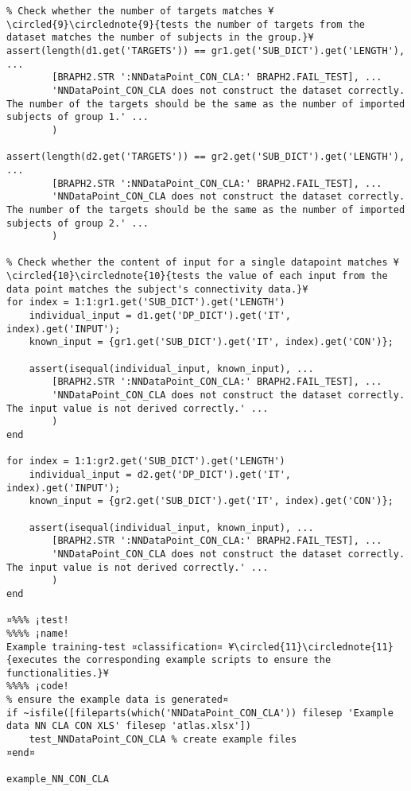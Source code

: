 \documentclass{tufte-handout}
\begin{document}
\begin{lstlisting}
% Check whether the number of targets matches ¥\circled{9}\circlednote{9}{tests the number of targets from the dataset matches the number of subjects in the group.}¥
assert(length(d1.get('TARGETS')) == gr1.get('SUB_DICT').get('LENGTH'), ...
		[BRAPH2.STR ':NNDataPoint_CON_CLA:' BRAPH2.FAIL_TEST], ...
		'NNDataPoint_CON_CLA does not construct the dataset correctly. The number of the targets should be the same as the number of imported subjects of group 1.' ...
		)

assert(length(d2.get('TARGETS')) == gr2.get('SUB_DICT').get('LENGTH'), ...
		[BRAPH2.STR ':NNDataPoint_CON_CLA:' BRAPH2.FAIL_TEST], ...
		'NNDataPoint_CON_CLA does not construct the dataset correctly. The number of the targets should be the same as the number of imported subjects of group 2.' ...
		)

% Check whether the content of input for a single datapoint matches ¥\circled{10}\circlednote{10}{tests the value of each input from the data point matches the subject's connectivity data.}¥
for index = 1:1:gr1.get('SUB_DICT').get('LENGTH')
    individual_input = d1.get('DP_DICT').get('IT', index).get('INPUT');
    known_input = {gr1.get('SUB_DICT').get('IT', index).get('CON')};

    assert(isequal(individual_input, known_input), ...
        [BRAPH2.STR ':NNDataPoint_CON_CLA:' BRAPH2.FAIL_TEST], ...
        'NNDataPoint_CON_CLA does not construct the dataset correctly. The input value is not derived correctly.' ...
        )
end

for index = 1:1:gr2.get('SUB_DICT').get('LENGTH')
    individual_input = d2.get('DP_DICT').get('IT', index).get('INPUT');
    known_input = {gr2.get('SUB_DICT').get('IT', index).get('CON')};

    assert(isequal(individual_input, known_input), ...
        [BRAPH2.STR ':NNDataPoint_CON_CLA:' BRAPH2.FAIL_TEST], ...
        'NNDataPoint_CON_CLA does not construct the dataset correctly. The input value is not derived correctly.' ...
        )
end

¤%%% ¡test! 
%%%% ¡name!
Example training-test ¤classification¤ ¥\circled{11}\circlednote{11}{executes the corresponding example scripts to ensure the functionalities.}¥
%%%% ¡code!
% ensure the example data is generated¤
if ~isfile([fileparts(which('NNDataPoint_CON_CLA')) filesep 'Example data NN CLA CON XLS' filesep 'atlas.xlsx'])
    test_NNDataPoint_CON_CLA % create example files
¤end¤

example_NN_CON_CLA

\end{lstlisting}
\end{document}
